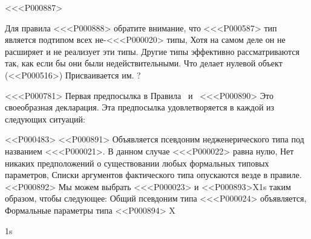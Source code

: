 <<<P000887>{%
Для правила <<<P000888> обратите внимание, что <<<P000587> тип
является подтипом всех не-<<<P000020> типы,
Хотя на самом деле он не расширяет и не реализует эти типы.
Другие типы эффективно рассматриваются так, как если бы они были недействительными.
Что делает нулевой объект (<<P000516>) Присваивается им. %
?

<<<P000781>%
Первая предпосылка в
Правила ~\SrnLeftTypeAlias и ~<<<P000890>
Это своеобразная декларация.
Эта предпосылка удовлетворяется в каждой из следующих ситуаций:

<<P000483>
<<P000891> Объявляется псевдоним недженерического типа под названием <<<P000021>.
В данном случае <<<P000022> равна нулю,
Нет никаких предположений о существовании
любых формальных типовых параметров,
Списки аргументов фактического типа опускаются везде в правиле.
<<P000892> Мы можем выбрать <<<P000023> и <<P000893>{X}{1}{s} таким образом, чтобы следующее:
Общий псевдоним типа <<<P000024> объявляется,
Формальные параметры типа <<P000894> X}{1}{s}
